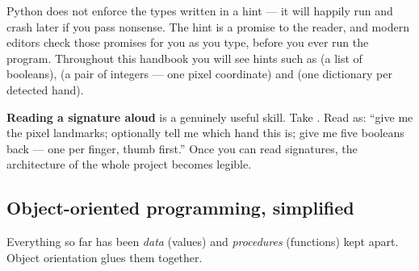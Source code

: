 Python does not enforce the types written in a hint --- it will happily run and crash later if you
pass nonsense. The hint is a promise to the reader, and modern editors check those promises for you
as you type, before you ever run the program. Throughout this handbook you will see hints such as
 (a list of booleans),  (a pair of integers --- one pixel
coordinate) and  (one dictionary per detected hand).

\begin{keyidea}
\textbf{Reading a signature aloud} is a genuinely useful skill. Take
.
Read as: ``give me the pixel landmarks; optionally tell me which hand this is; give me five booleans
back --- one per finger, thumb first.'' Once you can read signatures, the architecture of the whole
project becomes legible.
\end{keyidea}

\subsection{Object-oriented programming, simplified}
\label{sec:oop}

Everything so far has been \emph{data} (values) and \emph{procedures} (functions) kept apart. Object
orientation glues them together.


